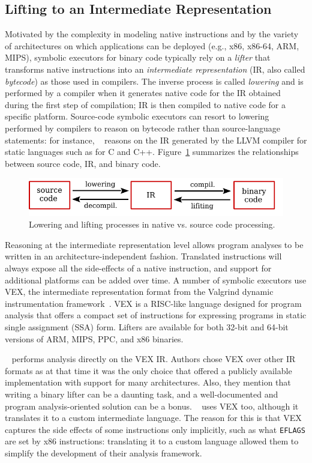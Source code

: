 \subsection{Lifting to an Intermediate Representation}
Motivated by the complexity in modeling native instructions and by the variety of architectures on which applications can be deployed (e.g., x86, x86-64, ARM, MIPS), symbolic executors for binary code typically rely on a {\em lifter} that transforms native instructions into an {\em intermediate representation} (IR, also called {\em bytecode}) as those used in compilers. The inverse process is called {\em lowering} and is performed by a compiler when it generates native code for the IR obtained during the first step of compilation; IR is then compiled to native code for a specific platform. Source-code symbolic executors can resort to lowering performed by compilers to reason on bytecode rather than source-language statements: for instance, ~\cite{KLEE-OSDI08} reasons on the IR generated by the LLVM compiler for static languages such as for C and C++. Figure~\ref{fig:lowering} summarizes the relationships between source code, IR, and binary code.

\begin{figure}[h!]
  \centering
  \includegraphics[width=.7\columnwidth]{images/compiler}
  \caption{\label{fig:lowering} Lowering and lifting processes in native vs. source code processing.}
\end{figure}

Reasoning at the intermediate representation level allows program analyses to be written in an architecture-independent fashion. Translated instructions will always expose all the side-effects of a native instruction, and support for additional platforms can be added over time. A number of symbolic executors use VEX, the intermediate representation format from the Valgrind dynamic instrumentation framework~\cite{VALGRIND-PLDI07}. VEX is a RISC-like language designed for program analysis that offers a compact set of instructions for expressing programs in static single assignment (SSA) form. Lifters are available for both 32-bit and 64-bit versions of ARM, MIPS, PPC, and x86 binaries.

~\cite{ANGR-SP16} performs analysis directly on the VEX IR. Authors chose VEX over other IR formats as at that time it was the only choice that offered a publicly available implementation with support for many architectures. Also, they mention that writing a binary lifter can be a daunting task, and a well-documented and program analysis-oriented solution can be a bonus. ~\cite{BITBLAZE-ICISS08} uses VEX too, although it translates it to a custom intermediate language. The reason for this is that VEX captures the side effects of some instructions only implicitly, such as what {\tt EFLAGS} are set by x86 instructions: translating it to a custom language allowed them to simplify the development of their analysis framework.

